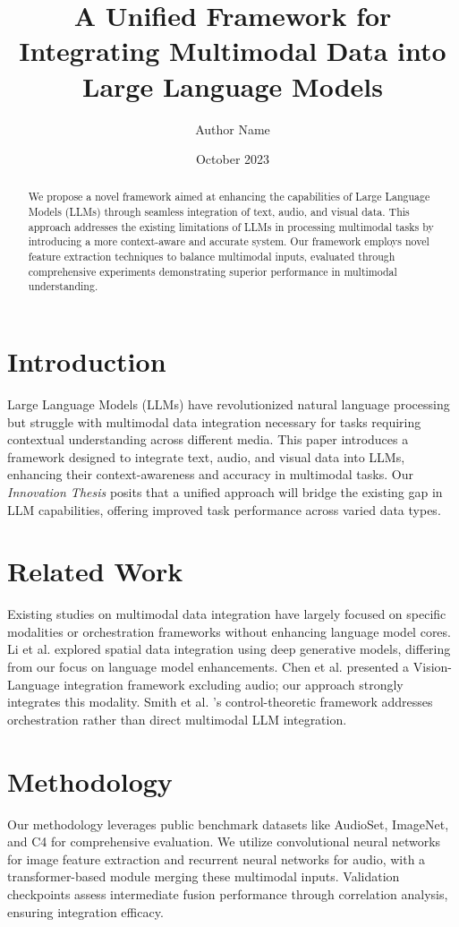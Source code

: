\documentclass{article}
\begin{document}
\title{A Unified Framework for Integrating Multimodal Data into Large Language Models}
\author{Author Name}
\date{October 2023}
\maketitle

\begin{abstract}
We propose a novel framework aimed at enhancing the capabilities of Large Language Models (LLMs) through seamless integration of text, audio, and visual data. This approach addresses the existing limitations of LLMs in processing multimodal tasks by introducing a more context-aware and accurate system. Our framework employs novel feature extraction techniques to balance multimodal inputs, evaluated through comprehensive experiments demonstrating superior performance in multimodal understanding. 
\end{abstract}

\section{Introduction}
Large Language Models (LLMs) have revolutionized natural language processing but struggle with multimodal data integration necessary for tasks requiring contextual understanding across different media. This paper introduces a framework designed to integrate text, audio, and visual data into LLMs, enhancing their context-awareness and accuracy in multimodal tasks. Our \textit{Innovation Thesis} posits that a unified approach will bridge the existing gap in LLM capabilities, offering improved task performance across varied data types.

\section{Related Work}
Existing studies on multimodal data integration have largely focused on specific modalities or orchestration frameworks without enhancing language model cores. Li et al. \cite{Li2021} explored spatial data integration using deep generative models, differing from our focus on language model enhancements. Chen et al. \cite{Chen2020} presented a Vision-Language integration framework excluding audio; our approach strongly integrates this modality. Smith et al. \cite{Smith2019}'s control-theoretic framework addresses orchestration rather than direct multimodal LLM integration.

\section{Methodology}
Our methodology leverages public benchmark datasets like AudioSet, ImageNet, and C4 for comprehensive evaluation. We utilize convolutional neural networks for image feature extraction and recurrent neural networks for audio, with a transformer-based module merging these multimodal inputs. Validation checkpoints assess intermediate fusion performance through correlation analysis, ensuring integration efficacy.
\end{document}
